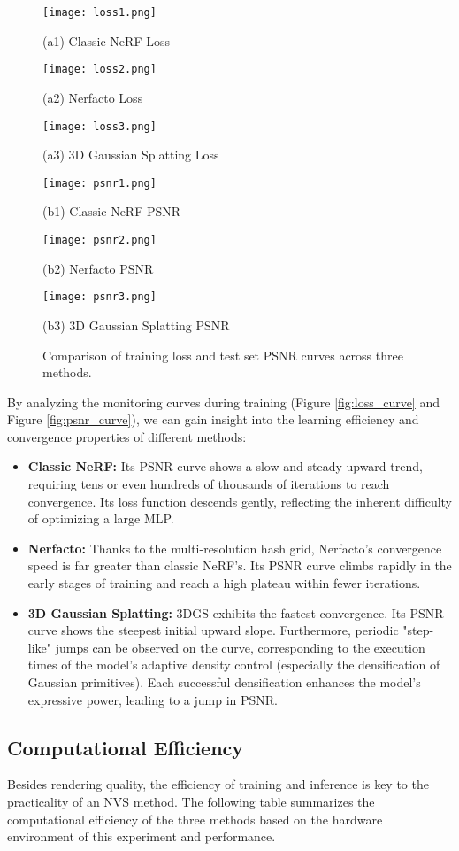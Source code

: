 \documentclass[11pt]{article}
\begin{document}
\begin{figure}[h!]
    \centering
    \begin{minipage}[t]{0.48\textwidth}
        \centering
        \texttt{[image: loss1.png]}
        \caption*{(a1) Classic NeRF Loss}
        \texttt{[image: loss2.png]}
        \caption*{(a2) Nerfacto Loss}
        \texttt{[image: loss3.png]}
        \caption*{(a3) 3D Gaussian Splatting Loss}
    \end{minipage}%
    \hfill
    \begin{minipage}[t]{0.48\textwidth}
        \centering
        \texttt{[image: psnr1.png]}
        \caption*{(b1) Classic NeRF PSNR}
        \texttt{[image: psnr2.png]}
        \caption*{(b2) Nerfacto PSNR}
        \texttt{[image: psnr3.png]}
        \caption*{(b3) 3D Gaussian Splatting PSNR}
    \end{minipage}
    \caption{Comparison of training loss and test set PSNR curves across three methods.}
    \label{fig:loss_psnr_comparison}
\end{figure}
By analyzing the monitoring curves during training (Figure \ref{fig:loss_curve} and Figure \ref{fig:psnr_curve}), we can gain insight into the learning efficiency and convergence properties of different methods:
\begin{itemize}
    \item \textbf{Classic NeRF:} Its PSNR curve shows a slow and steady upward trend, requiring tens or even hundreds of thousands of iterations to reach convergence. Its loss function descends gently, reflecting the inherent difficulty of optimizing a large MLP.
    \item \textbf{Nerfacto:} Thanks to the multi-resolution hash grid, Nerfacto's convergence speed is far greater than classic NeRF's. Its PSNR curve climbs rapidly in the early stages of training and reach a high plateau within fewer iterations.
    \item \textbf{3D Gaussian Splatting:} 3DGS exhibits the fastest convergence. Its PSNR curve shows the steepest initial upward slope. Furthermore, periodic "step-like" jumps can be observed on the curve, corresponding to the execution times of the model's adaptive density control (especially the densification of Gaussian primitives). Each successful densification enhances the model's expressive power, leading to a jump in PSNR.
\end{itemize}

\subsection{Computational Efficiency}
Besides rendering quality, the efficiency of training and inference is key to the practicality of an NVS method. The following table summarizes the computational efficiency of the three methods based on the hardware environment of this experiment and performance.
\end{document}
